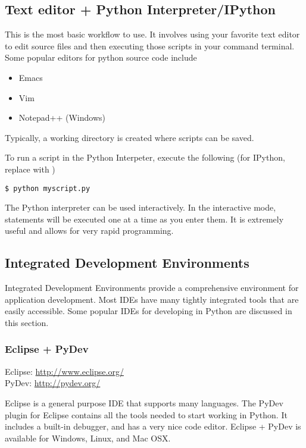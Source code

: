 \subsection*{Text editor + Python Interpreter/IPython}
This is the most basic workflow to use.  It involves using your favorite text editor to edit source files and then executing those scripts in your command terminal.  Some popular editors for python source code include
\begin{itemize}
\item Emacs
\item Vim
\item Notepad++ (Windows)
\end{itemize}

Typically, a working directory is created where scripts can be saved.

To run a script in the Python Interpeter, execute the following (for IPython, replace  with )
\begin{verbatim}
$ python myscript.py
\end{verbatim}

The Python interpreter can be used interactively.  In the interactive mode, statements will be executed one at a time as you enter them.  It is extremely useful and allows for very rapid programming.

\subsection*{Integrated Development Environments}
Integrated Development Environments provide a comprehensive environment for application development.  Most IDEs have many tightly integrated tools that are easily accessible.  Some popular IDEs for developing in Python are discussed in this section.

\subsubsection*{Eclipse + PyDev}

Eclipse: \url{http://www.eclipse.org/} \\
PyDev: \url{http://pydev.org/}

Eclipse is a general purpose IDE that supports many languages.  The PyDev plugin for Eclipse contains all the tools needed to start working in Python.  It includes a built-in debugger, and has a very nice code editor.  Eclipse + PyDev is available for Windows, Linux, and Mac OSX.

